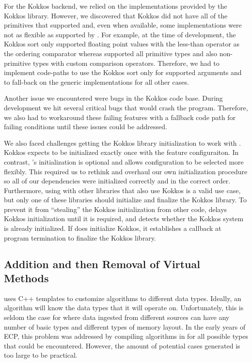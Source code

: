 For the Kokkos backend, we relied on the implementations provided by the Kokkos library.
However, we discovered that Kokkos did not have all of the primitives that \vtkm supported and, even when available, some implementations were not as flexible as supported by \vtkm.
For example, at the time of development, the Kokkos sort only supported floating point values with the less-than operator as the ordering comparator
whereas \vtkm supported all primitive types and also non-primitive types with custom comparison operators.
Therefore, we had to implement code-paths to use the Kokkos sort only for supported arguments and to fall-back on the generic \vtkm implementations for all other cases.

Another issue we encountered were bugs in the Kokkos code base. During development we hit several critical bugs that would crash the program. Therefore, we also had to workaround these failing features with a fallback code path for failing conditions until these issues could be addressed.

We also faced challenges getting the Kokkos library initialization to work with \vtkm.
Kokkos expects to be initialized exactly once with the feature configuraiton.
In contrast, \vtkm's initialization is optional and allows configuration to be selected more flexibly.
This required us to rethink and overhaul our own initialization procedure so all of our dependencies were initialized correctly and in the correct order.
Furthermore, using \vtkm with other libraries that also use Kokkos is a valid use case, but only one of these libraries should initialize and finalize the Kokkos library.
To prevent it from ``stealing'' the Kokkos initialization from other code, \vtkm delays Kokkos initialization until it is required, and detects whether the Kokkos system is already initialized.
If \vtkm does initialize Kokkos, it establishes a callback at program termination to finalize the Kokkos library.

\subsection{Addition and then Removal of Virtual Methods}
\label{sec:virtual-methods}


\vtkm uses C++ templates to customize algorithms to different data types.
Ideally, an algorithm
will know the data types that it will operate on.
Unfortunately, this is seldom the case for \vtkm where data ingested from different sources can have any number of basic types
and different types of memory layout.
In the early years of ECP, this problem was addressed by compiling algorithms in \vtkm for all possible types that could be encountered.
However, the amount of potential cases generated is too large to be practical.

